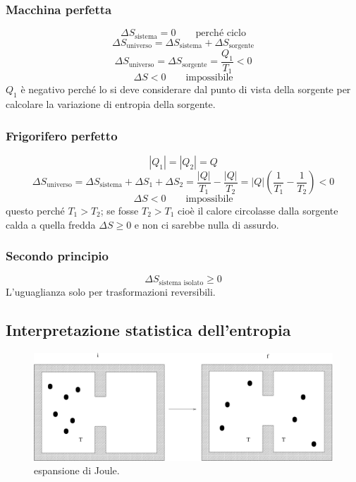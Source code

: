 \subsubsection{Macchina perfetta}

\[\Delta S_\text{sistema}=0 \qquad\text{perché ciclo}\]
\[\Delta S_\text{universo}=\Delta S_\text{sistema}+\Delta S_\text{sorgente}\]
\[\Delta S_\text{universo}=\Delta S_\text{sorgente}=\frac{Q_1}{T_1}<0\]
\[\Delta S<0\qquad \text{impossibile}\]
$Q_1$ è negativo perché lo si deve considerare dal punto di vista della sorgente per calcolare la variazione di entropia della sorgente.

\subsubsection{Frigorifero perfetto}


\[|Q_1|=|Q_2|=Q\]
\[\Delta S_\text{universo}=\Delta S_\text{sistema}+\Delta S_1+\Delta S_2=\frac{|Q|}{T_1}-\frac{|Q|}{T_2}=|Q|\left(\frac{1}{T_1}-\frac{1}{T_2}\right)<0\]
\[\Delta S<0\qquad \text{impossibile}\]
questo perché $T_1>T_2$; se fosse $T_2>T_1$ cioè il calore circolasse dalla sorgente calda a quella fredda $\Delta S\geq 0$ e non ci sarebbe nulla di assurdo.

\subsubsection{Secondo principio}
\[\Delta S_\text{sistema isolato}\geq 0\]
L'uguaglianza solo per trasformazioni reversibili.


\subsection{Interpretazione statistica dell'entropia}
\begin{figure}[htbp]
\centering
\includegraphics[scale=0.45]{immagini/fisica1/exp_Joule}
\caption{espansione di Joule.}
\end{figure}

